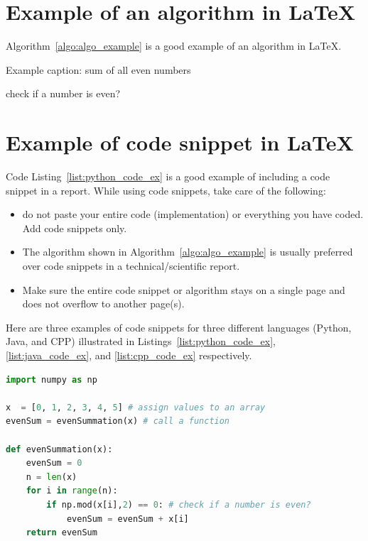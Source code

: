 \section{Example of an algorithm in \LaTeX}
Algorithm~\ref{algo:algo_example} is a good example of an algorithm in \LaTeX.  
\begin{algorithm}
    \caption{Example caption: sum of all even numbers}
    \label{algo:algo_example}
    \begin{algorithmic}[1]
        \Statex
          \Comment check if a number is even?
        \EndIf
        \EndFor
        \State {}
        \EndFunction
    \end{algorithmic}
\end{algorithm}
 
\section{Example of code snippet  in \LaTeX}

Code Listing~\ref{list:python_code_ex} is a good example of including a code snippet in a report. While using code snippets, take care of the following:
\begin{itemize}
    \item do not paste your entire code (implementation) or everything you have coded. Add code snippets only. 
    \item The algorithm shown in Algorithm~\ref{algo:algo_example} is usually preferred over code snippets in a technical/scientific report. 
    \item Make sure the entire code snippet or algorithm stays on a single page and does not overflow to another page(s).  
\end{itemize}

Here are three examples of code snippets for three different languages (Python, Java, and CPP) illustrated in Listings~\ref{list:python_code_ex}, \ref{list:java_code_ex}, and \ref{list:cpp_code_ex} respectively.  

\begin{lstlisting}[language=Python, caption={Code snippet in \LaTeX ~and  this is a Python code example}, label=list:python_code_ex]
import numpy as np

x  = [0, 1, 2, 3, 4, 5] # assign values to an array
evenSum = evenSummation(x) # call a function

def evenSummation(x):
    evenSum = 0
    n = len(x)
    for i in range(n):
        if np.mod(x[i],2) == 0: # check if a number is even?
            evenSum = evenSum + x[i]
    return evenSum
\end{lstlisting}

